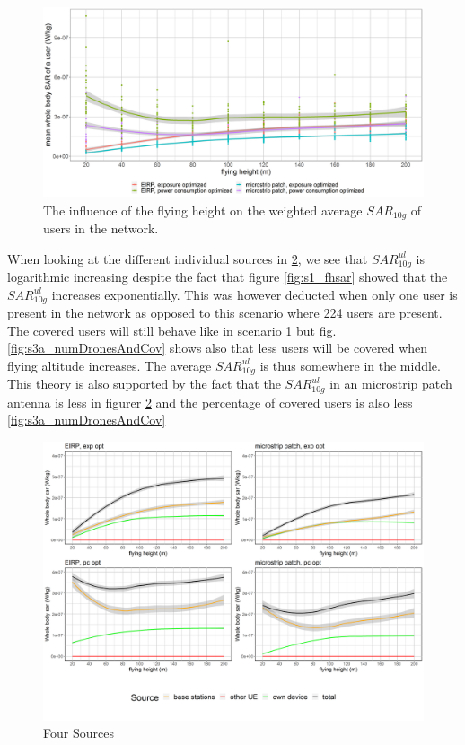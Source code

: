 \begin{figure}[]
  \includegraphics[width=\textwidth]{../results/s3/fhvssar.png}
  \caption{The influence of the flying height on the weighted average $SAR_{10g}$ of users in the network.}
  \label{fig:s3a_sar}
\end{figure}

When looking at the different individual sources in \ref{fig:s3a_fourSourcesMatrix}, we see 
that $SAR_{10g}^{ul}$ is logarithmic increasing despite the fact that figure \ref{fig:s1_fhsar} showed that the $SAR_{10g}^{ul}$
increases exponentially. This was however deducted when only one user is present in the network as opposed to this scenario 
where 224 users are present. The covered users will still behave like in scenario 1 but fig. \ref{fig:s3a_numDronesAndCov} 
shows also that less users will be covered when flying altitude increases. The average $SAR_{10g}^{ul}$ is thus somewhere in the middle.
This theory is also supported by the fact that the $SAR_{10g}^{ul}$ in an microstrip patch antenna is less in figurer \ref{fig:s3a_fourSourcesMatrix} 
and the percentage of covered users is also less \ref{fig:s3a_numDronesAndCov}

\begin{figure}[]
  \includegraphics[width=\textwidth]{../results/s3/fhFourSources.png}
  \caption{Four Sources}
  \label{fig:s3a_fourSourcesMatrix}
\end{figure}

